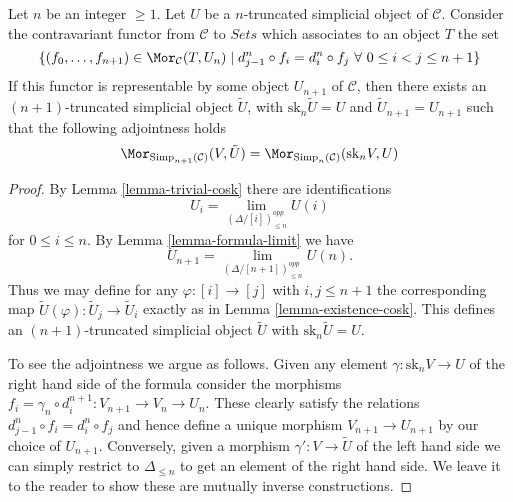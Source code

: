 \begin{lemma}
\label{lemma-work-out}
Let $n$ be an integer $\geq 1$. Let $U$ be a $n$-truncated
simplicial object of $\mathcal{C}$. Consider the
contravariant functor from $\mathcal{C}$ to $\textit{Sets}$
which associates to an object $T$ the set
$$
\{ (f_0, \ldots, f_{n + 1}) \in \Mor_\mathcal{C}(T, U_n)
\mid
d^n_{j - 1} \circ f_i = d^n_i \circ f_j
\ \forall\ 0\leq i < j\leq n + 1\}
$$
If this functor is representable by some object $U_{n + 1}$
of $\mathcal{C}$, then there exists an $(n + 1)$-truncated
simplicial object $\tilde U$, with $\text{sk}_n \tilde U = U$
and $\tilde U_{n + 1} = U_{n + 1}$ such that the following
adjointness holds
$$
\Mor_{\text{Simp}_{n + 1}(\mathcal{C})}(V, \tilde U)
=
\Mor_{\text{Simp}_n(\mathcal{C})}(\text{sk}_nV, U)
$$
\end{lemma}

\begin{proof}
By Lemma \ref{lemma-trivial-cosk} there are identifications
$$
U_i = \lim_{(\Delta/[i])_{\leq n}^{opp}} U(i)
$$
for $0 \leq i \leq n$. By Lemma \ref{lemma-formula-limit}
we have
$$
U_{n + 1} = \lim_{(\Delta/[n + 1])_{\leq n}^{opp}} U(n).
$$
Thus we may define for any $\varphi : [i] \to [j]$
with $i, j \leq n + 1$ the corresponding map
$\tilde U(\varphi) : \tilde U_j \to \tilde U_i$ exactly as
in Lemma \ref{lemma-existence-cosk}. This defines
an $(n + 1)$-truncated simplicial object $\tilde U$
with $\text{sk}_n \tilde U = U$.

\medskip\noindent
To see the adjointness we argue as follows. Given any element
$\gamma : \text{sk}_n V \to U$ of the right hand side of the formula
consider the morphisms
$f_i = \gamma_n \circ d^{n + 1}_i : V_{n + 1} \to V_n \to U_n$.
These clearly satisfy the relations $d^n_{j - 1} \circ f_i = d^n_i \circ f_j$
and hence define a unique morphism $V_{n + 1} \to U_{n + 1}$
by our choice of $U_{n + 1}$.
Conversely, given a morphism $\gamma' : V \to \tilde U$
of the left hand side we can simply restrict to
$\Delta_{\leq n}$ to get an element of the right hand side.
We leave it to the reader to show these are mutually inverse
constructions.
\end{proof}

